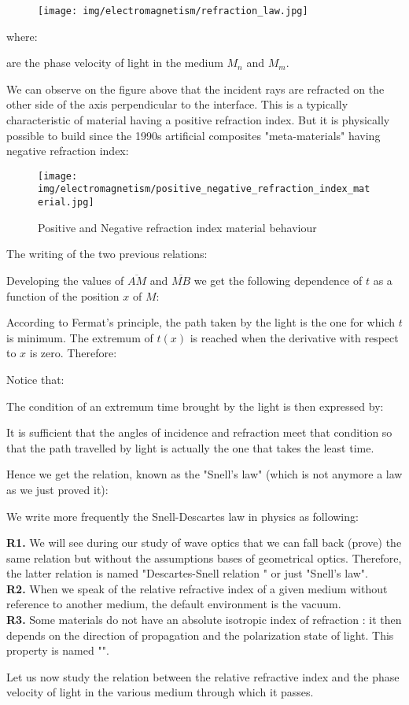 	\begin{figure}[H]
		\centering
		\texttt{[image: img/electromagnetism/refraction\_law.jpg]}
	\end{figure}
	where:
	
	are the phase velocity of light in the medium $M_n$ and $M_m$.
	
	We can observe on the figure above that the incident rays are refracted on the other side of the axis perpendicular to the interface. This is a typically characteristic of material having a positive refraction index. But it is physically possible to build since the 1990s artificial  composites  "meta-materials" having negative refraction  index:
	\begin{figure}[H]
		\centering
		\texttt{[image: img/electromagnetism/positive\_negative\_refraction\_index\_material.jpg]}
		\caption{Positive and Negative refraction index material behaviour}
	\end{figure}
	
	The writing of the two previous relations:
	
	Developing the values of $\overline{AM}$ and $\overline{MB}$ we get the following dependence of $t$ as a function of the position $x$ of $M$:
	
	According to Fermat's principle, the path taken by the light is the one for which $t$ is minimum. The extremum of $t (x)$ is reached when the derivative with respect to $x$ is zero. Therefore:
	
	Notice that:
	
	The condition of an extremum time brought by the light is then expressed by:
	
	It is sufficient that the angles of incidence and refraction meet that condition so that the path travelled by light is actually the one that takes the least time.
	
	Hence we get the relation, known as the "Snell's law" (which is not anymore a law as we just proved it):
	

	We write more frequently the Snell-Descartes law in physics as following:
	
	\begin{tcolorbox}[title=Remarks,colframe=black,arc=10pt]
	\textbf{R1.} We will see during our study of wave optics that we can fall back (prove) the same relation but without the assumptions bases of geometrical optics. Therefore, the latter relation is named "Descartes-Snell relation " or just "Snell's law".\\
	
	\textbf{R2.} When we speak of the relative refractive index of a given medium without reference to another medium, the default environment is the vacuum.\\
	
	\textbf{R3.} Some materials do not have an absolute isotropic index of refraction : it then depends on the direction of propagation and the polarization state of light. This property is named "".
	\end{tcolorbox}
	Let us now study the relation between the relative refractive index and the phase velocity of light in the various medium through which it passes.

